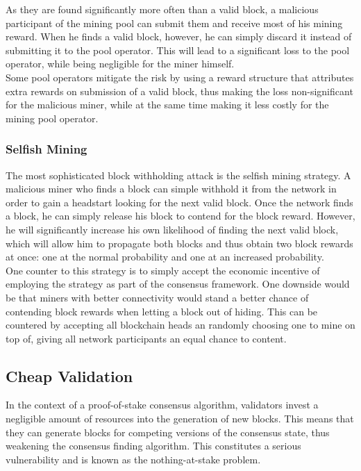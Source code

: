 \documentclass[11pt,a4paper]{article}
\begin{document}
As they are found significantly more often than a valid block, a malicious participant of the mining pool can submit them and receive most of his mining reward. When he finds a valid block, however, he can simply discard it instead of submitting it to the pool operator. This will lead to a significant loss to the pool operator, while being negligible for the miner himself.\\

Some pool operators mitigate the risk by using a reward structure that attributes extra rewards on submission of a valid block, thus making the loss non-significant for the malicious miner, while at the same time making it less costly for the mining pool operator.\\

\subsubsection{Selfish Mining}

The most sophisticated block withholding attack is the selfish mining strategy. A malicious miner who finds a block can simple withhold it from the network in order to gain a headstart looking for the next valid block. Once the network finds a block, he can simply release his block to contend for the block reward. However, he will significantly increase his own likelihood of finding the next valid block, which will allow him to propagate both blocks and thus obtain two block rewards at once: one at the normal probability and one at an increased probability.\\

One counter to this strategy is to simply accept the economic incentive of employing the strategy as part of the consensus framework. One downside would be that miners with better connectivity would stand a better chance of contending block rewards when letting a block out of hiding. This can be countered by accepting all blockchain heads an randomly choosing one to mine on top of, giving all network participants an equal chance to content.\\

\subsection{Cheap Validation}

In the context of a proof-of-stake consensus algorithm, validators invest a negligible amount of resources into the generation of new blocks. This means that they can generate blocks for competing versions of the consensus state, thus weakening the consensus finding algorithm. This constitutes a serious vulnerability and is known as the nothing-at-stake problem.\\
\end{document}
